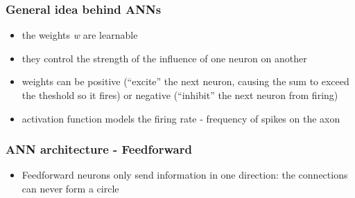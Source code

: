 \documentclass[xcolor=table]{beamer}
\begin{document}
\begin{mdframe}%

\frametitle{General idea behind ANNs}\label{heading-sec-general-idea-behind-anns}%

\begin{itemize}%

\item{}
the weights \emph{w} are learnable%

\item{}
they control the strength of the influence of one neuron on another%

\item{}
weights can be positive (\textquotedblleft{}excite\textquotedblright{} the next neuron, causing the sum to exceed the theshold so it fires) or negative (\textquotedblleft{}inhibit\textquotedblright{} the next neuron from firing)%

\item{}
activation function models the firing rate - frequency of spikes on the axon%
\end{itemize}%
\end{mdframe}\label{sec-general-idea-behind-anns}%

\begin{mdframe}%

\frametitle{ANN architecture - Feedforward}\label{heading-sec-ann-architecture---feedforward}%

\begin{itemize}[noitemsep,topsep=\mdcompacttopsep]%

\item{}Feedforward neurons only send information in one direction: the connections can never form a circle%
\end{itemize}%
\end{mdframe}\label{sec-ann-architecture---feedforward}%
\end{document}
